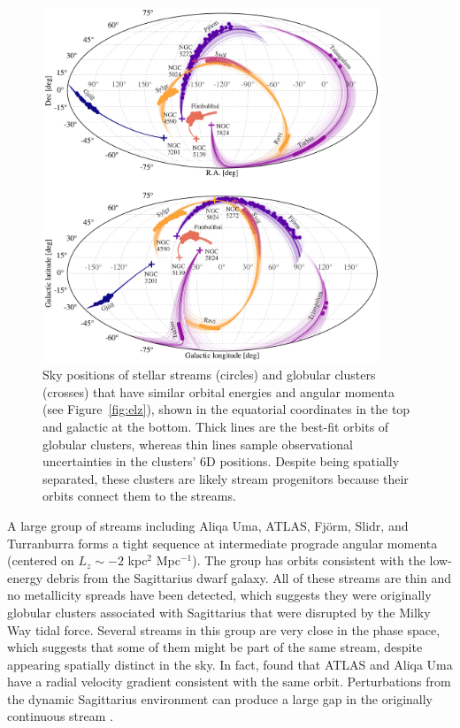 \documentclass[twocolumn]{aastex63}
\begin{document}
\begin{figure}
\begin{center}
\includegraphics[width=0.9\textwidth]{sky_orbits.pdf}
\end{center}
\caption{
Sky positions of stellar streams (circles) and globular clusters (crosses) that have similar orbital energies and angular momenta (see Figure~\ref{fig:elz}), shown in the equatorial coordinates in the top and galactic at the bottom.
Thick lines are the best-fit orbits of globular clusters, whereas thin lines sample observational uncertainties in the clusters' 6D positions.
Despite being spatially separated, these clusters are likely stream progenitors because their orbits connect them to the streams.
}
\label{fig:sky}
\end{figure}

A large group of streams including Aliqa Uma, ATLAS, Fj\" orm, Slidr, and Turranburra forms a tight sequence at intermediate prograde angular momenta (centered on $L_z\sim-2$ kpc$^2$ Mpc$^{-1}$).
The group has orbits consistent with the low-energy debris from the Sagittarius dwarf galaxy.
All of these streams are thin and no metallicity spreads have been detected, which suggests they were originally globular clusters associated with Sagittarius that were disrupted by the Milky Way tidal force.
Several streams in this group are very close in the phase space, which suggests that some of them might be part of the same stream, despite appearing spatially distinct in the sky.
In fact, \citet{li2020} found that ATLAS and Aliqa Uma have a radial velocity gradient consistent with the same orbit.
Perturbations from the dynamic Sagittarius environment can produce a large gap in the originally continuous stream \citep{bonaca2020b, deboer2020}.
\end{document}
